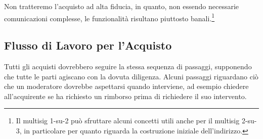 Non tratteremo l'acquisto ad alta fiducia, in quanto, non essendo necessarie comunicazioni complesse, le funzionalità risultano piuttosto banali.\footnote{Il multisig 1-su-2 può sfruttare alcuni concetti utili anche per il multisig 2-su-3, in particolare per quanto riguarda la costruzione iniziale dell'indirizzo.}


\subsection{Flusso di Lavoro per l'Acquisto}
\label{subsec:escrowed-marketplace-purchasing-workflow}

Tutti gli acquisti dovrebbero seguire la stessa sequenza di passaggi, supponendo che tutte le parti agiscano con la dovuta diligenza. Alcuni passaggi riguardano ciò che un moderatore dovrebbe aspettarsi quando interviene, ad esempio chiedere all'acquirente se ha richiesto un rimborso prima di richiedere il suo intervento.
